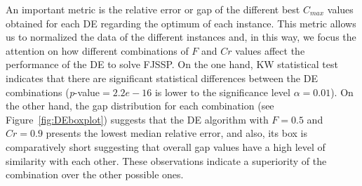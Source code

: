 An important metric is the relative error or gap of the different best $C_{max}$ values obtained for each DE regarding the optimum of each instance. This metric allows us to normalized the data of the different instances and, in this way, we focus the attention on how different combinations of $F$ and $Cr$ values affect the performance of the DE to solve FJSSP. On the one hand, KW statistical test indicates that there are significant statistical differences between the DE combinations (\textit{p}-value$=2.2e-16$ is lower to the significance level $\alpha = 0.01$). On the other hand, the gap distribution for each combination (see Figure~\ref{fig:DEboxplot}) suggests that the DE algorithm with $F=0.5$ and $Cr=0.9$ presents the lowest median relative error, and also, its box is comparatively short suggesting that overall gap values have a high level of similarity with each other. These observations indicate a superiority of the combination over the other possible ones.  

